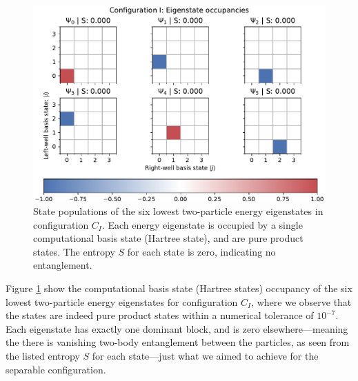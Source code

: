 \documentclass{subfiles}
\begin{document}
\begin{figure}[h!]
  \centering
  \includegraphics[width=\textwidth]{figs/state_populations_I.pdf}
  \caption{State populations of the six lowest two-particle energy eigenstates in configuration $C_I$. Each energy eigenstate is occupied by a single computational basis state (Hartree state), and are pure product states. The entropy $S$ for each state is zero, indicating no entanglement.}
  \label{fig:populations_I}
\end{figure}
Figure \ref{fig:populations_I} show the computational basis state (Hartree states) occupancy of the six lowest two-particle energy eigenstates for configuration $C_I$, where we observe that the states are indeed pure product states within a numerical tolerance of $10^{-7}$. Each eigenstate has exactly one dominant block, and is zero elsewhere—meaning the there is vanishing two-body entanglement between the particles, as seen from the listed entropy $S$ for each state—just what we aimed to achieve for the separable configuration. 
\\
\end{document}
